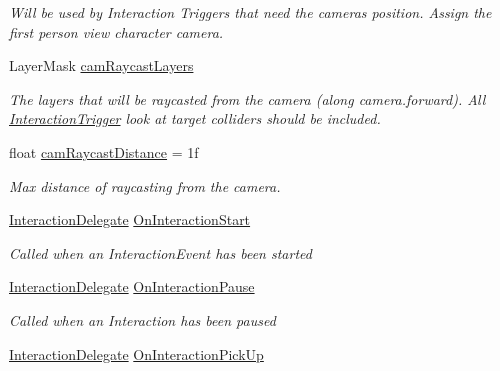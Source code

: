 \begin{DoxyCompactItemize}
\begin{DoxyCompactList}\small\item\em Will be used by Interaction Triggers that need the camera\textquotesingle{}s position. Assign the first person view character camera. \end{DoxyCompactList}\item 
Layer\+Mask \mbox{\hyperlink{class_root_motion_1_1_final_i_k_1_1_interaction_system_aabd7d1c80c5fe0c7251823039468ccee}{cam\+Raycast\+Layers}}
\begin{DoxyCompactList}\small\item\em The layers that will be raycasted from the camera (along camera.\+forward). All \mbox{\hyperlink{class_root_motion_1_1_final_i_k_1_1_interaction_trigger}{Interaction\+Trigger}} look at target colliders should be included. \end{DoxyCompactList}\item 
float \mbox{\hyperlink{class_root_motion_1_1_final_i_k_1_1_interaction_system_a7bfaced959ab8b78f42b2a5ee791a66e}{cam\+Raycast\+Distance}} = 1f
\begin{DoxyCompactList}\small\item\em Max distance of raycasting from the camera. \end{DoxyCompactList}\item 
\mbox{\hyperlink{class_root_motion_1_1_final_i_k_1_1_interaction_system_aa5a8c5136773b4244ab8f7ce707620b7}{Interaction\+Delegate}} \mbox{\hyperlink{class_root_motion_1_1_final_i_k_1_1_interaction_system_af45e914f48faf63e66e276a88085ac57}{On\+Interaction\+Start}}
\begin{DoxyCompactList}\small\item\em Called when an Interaction\+Event has been started \end{DoxyCompactList}\item 
\mbox{\hyperlink{class_root_motion_1_1_final_i_k_1_1_interaction_system_aa5a8c5136773b4244ab8f7ce707620b7}{Interaction\+Delegate}} \mbox{\hyperlink{class_root_motion_1_1_final_i_k_1_1_interaction_system_a55b455594133b47497d458f36770e6f0}{On\+Interaction\+Pause}}
\begin{DoxyCompactList}\small\item\em Called when an Interaction has been paused \end{DoxyCompactList}\item 
\mbox{\hyperlink{class_root_motion_1_1_final_i_k_1_1_interaction_system_aa5a8c5136773b4244ab8f7ce707620b7}{Interaction\+Delegate}} \mbox{\hyperlink{class_root_motion_1_1_final_i_k_1_1_interaction_system_a1f35ff50a703f8f82fa302ae8510593d}{On\+Interaction\+Pick\+Up}}

\end{DoxyCompactItemize}
